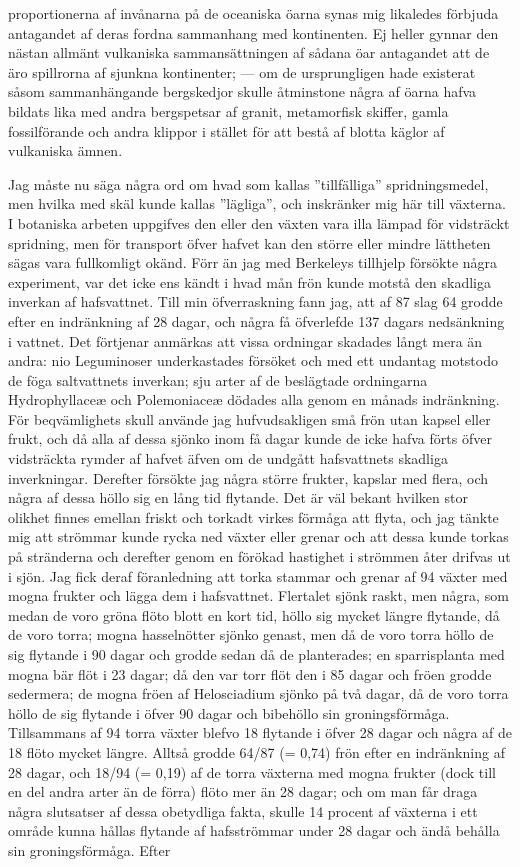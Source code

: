 proportionerna af invånarna på de oceaniska öarna synas mig likaledes förbjuda antagandet af deras fordna sammanhang med kontinenten. Ej heller gynnar den nästan allmänt vulkaniska sammansättningen af sådana öar antagandet att de äro spillrorna af sjunkna kontinenter; — om de ursprungligen hade existerat såsom sammanhängande bergskedjor skulle åtminstone några af öarna hafva bildats lika med andra bergspetsar af granit, metamorfisk skiffer, gamla fossilförande och andra klippor i stället för att bestå af blotta käglor af vulkaniska ämnen.

Jag måste nu säga några ord om hvad som kallas ”tillfälliga” spridningsmedel, men hvilka med skäl kunde kallas ”lägliga”, och inskränker mig här till växterna. I botaniska arbeten uppgifves den eller den växten vara illa lämpad för vidsträckt spridning, men för transport öfver hafvet kan den större eller mindre lättheten sägas vara fullkomligt okänd. Förr än jag med Berkeleys tillhjelp försökte några experiment, var det icke ens kändt i hvad mån frön kunde motstå den skadliga inverkan af hafsvattnet. Till min öfverraskning fann jag, att af 87 slag 64 grodde efter en indränkning af 28 dagar, och några få öfverlefde 137 dagars nedsänkning i vattnet. Det förtjenar anmärkas att vissa ordningar skadades långt mera än andra: nio Leguminoser underkastades försöket och med ett undantag motstodo de föga saltvattnets inverkan; sju arter af de beslägtade ordningarna Hydrophyllaceæ och Polemoniaceæ dödades alla genom en månads indränkning. För beqvämlighets skull använde jag hufvudsakligen små frön utan kapsel eller frukt, och då alla af dessa sjönko inom få dagar kunde de icke hafva förts öfver vidsträckta rymder af hafvet äfven om de undgått hafsvattnets skadliga inverkningar. Derefter försökte jag några större frukter, kapslar med flera, och några af dessa höllo sig en lång tid flytande. Det är väl bekant hvilken stor olikhet finnes emellan friskt och torkadt virkes förmåga att flyta, och jag tänkte mig att strömmar kunde rycka ned växter eller grenar och att dessa kunde torkas på stränderna och derefter genom en förökad hastighet i strömmen åter drifvas ut i sjön. Jag fick deraf föranledning att torka stammar och grenar af 94 växter med mogna frukter och lägga dem i hafsvattnet. Flertalet sjönk raskt, men några, som medan de voro gröna flöto blott en kort tid, höllo sig mycket längre flytande, då de voro torra; mogna hasselnötter sjönko genast, men då de voro torra höllo de sig flytande i 90 dagar och grodde sedan då de planterades; en sparrisplanta med mogna bär flöt i 23 dagar; då den var torr flöt den i 85 dagar och fröen grodde sedermera; de mogna fröen af Helosciadium sjönko på två dagar, då de voro torra höllo de sig flytande i öfver 90 dagar och bibehöllo sin groningsförmåga. Tillsammans af 94 torra växter blefvo 18 flytande i öfver 28 dagar och några af de 18 flöto mycket längre. Alltså grodde 64/87 (= 0,74) frön efter en indränkning af 28 dagar, och 18/94 (= 0,19) af de torra växterna med mogna frukter (dock till en del andra arter än de förra) flöto mer än 28 dagar; och om man får draga några slutsatser af dessa obetydliga fakta, skulle 14 procent af växterna i ett område kunna hållas flytande af hafsströmmar under 28 dagar och ändå behålla sin groningsförmåga. Efter 
